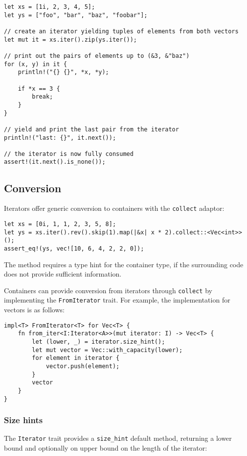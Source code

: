 \documentclass[]{article}
\begin{document}
\begin{verbatim}
let xs = [1i, 2, 3, 4, 5];
let ys = ["foo", "bar", "baz", "foobar"];

// create an iterator yielding tuples of elements from both vectors
let mut it = xs.iter().zip(ys.iter());

// print out the pairs of elements up to (&3, &"baz")
for (x, y) in it {
    println!("{} {}", *x, *y);

    if *x == 3 {
        break;
    }
}

// yield and print the last pair from the iterator
println!("last: {}", it.next());

// the iterator is now fully consumed
assert!(it.next().is_none());
\end{verbatim}

\subsection{Conversion}\label{conversion}

Iterators offer generic conversion to containers with the
\texttt{collect} adaptor:

\begin{verbatim}
let xs = [0i, 1, 1, 2, 3, 5, 8];
let ys = xs.iter().rev().skip(1).map(|&x| x * 2).collect::<Vec<int>>();
assert_eq!(ys, vec![10, 6, 4, 2, 2, 0]);
\end{verbatim}

The method requires a type hint for the container type, if the
surrounding code does not provide sufficient information.

Containers can provide conversion from iterators through
\texttt{collect} by implementing the \texttt{FromIterator} trait. For
example, the implementation for vectors is as follows:

\begin{verbatim}
impl<T> FromIterator<T> for Vec<T> {
    fn from_iter<I:Iterator<A>>(mut iterator: I) -> Vec<T> {
        let (lower, _) = iterator.size_hint();
        let mut vector = Vec::with_capacity(lower);
        for element in iterator {
            vector.push(element);
        }
        vector
    }
}
\end{verbatim}

\subsubsection{Size hints}\label{size-hints}

The \texttt{Iterator} trait provides a \texttt{size\_hint} default
method, returning a lower bound and optionally on upper bound on the
length of the iterator:
\end{document}
